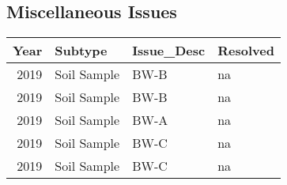 \documentclass[
  landscape]{article}
\begin{document}
\hypertarget{miscellaneous-issues}{%
\subsection{Miscellaneous Issues}\label{miscellaneous-issues}}

\begin{longtable}[]{@{}rlll@{}}
\toprule()
Year & Subtype & Issue\_Desc & Resolved \\
\midrule()
\endhead
2019 & Soil Sample & BW-B & na \\
2019 & Soil Sample & BW-B & na \\
2019 & Soil Sample & BW-A & na \\
2019 & Soil Sample & BW-C & na \\
2019 & Soil Sample & BW-C & na \\
\bottomrule()
\end{longtable}
\end{document}

